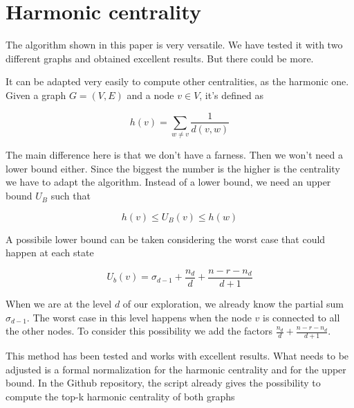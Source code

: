\section{Harmonic centrality}

The algorithm shown in this paper is very versatile. We have tested it with two different graphs and obtained excellent results. But there could be more.

\s \nd It can be adapted very easily to compute other centralities, as the harmonic one. Given a graph $G = (V,E)$ and a node $v \in V$, it's defined as

\begin{equation}
    h(v) = \sum_{w \neq v} \frac{1}{d(v,w)}
\end{equation}

\nd The main difference here is that we don't have a farness. Then we won't need a lower bound either. Since the biggest the number is the higher is the centrality we have to adapt the algorithm. Instead of a lower bound, we need an upper bound $U_B$ such that

\begin{equation}
    h(v) \leq U_B (v) \leq h(w)
\end{equation}

\nd A possibile lower bound can be taken considering the worst case that could happen at each state

\begin{equation}
    U_b (v) = \sigma_{d-1} + \frac{n_d}{d} + \frac{n - r - n_d}{d+1}
\end{equation}

\nd When we are at the level $d$ of our exploration, we already know the partial sum $\sigma_{d-1}$. The worst case in this level happens when the node $v$ is connected to all the other nodes. To consider this possibility we add the factors $\frac{n_d}{d} + \frac{n - r - n_d}{d+1}$.

\s \nd This method has been tested and works with excellent results. What needs to be adjusted is a formal normalization for the harmonic centrality and for the upper bound. In the Github repository, the script already gives the possibility to compute the top-k harmonic centrality of both graphs
